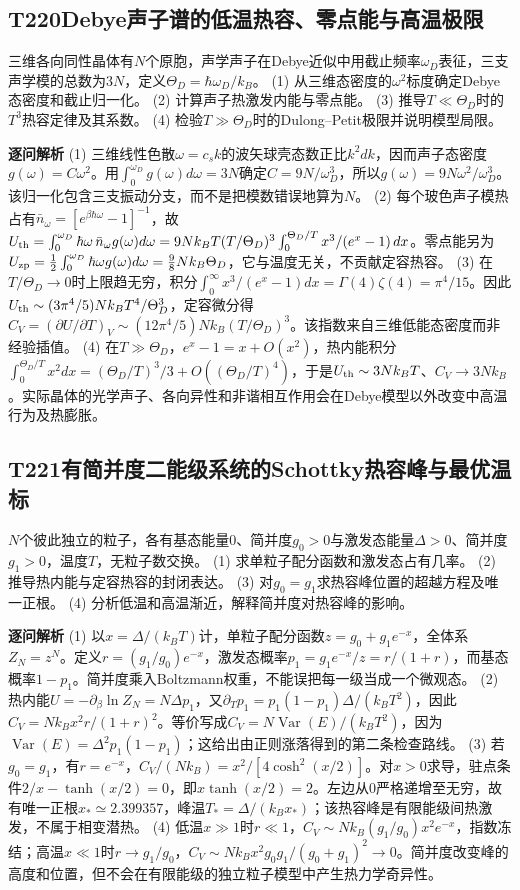 \subsection*{T220\quad Debye声子谱的低温热容、零点能与高温极限}
三维各向同性晶体有$N$个原胞，声学声子在Debye近似中用截止频率$\omega_D$表征，三支声学模的总数为$3N$，定义$\Theta_D=\hbar\omega_D/k_B$。
(1) 从三维态密度的$\omega^2$标度确定Debye态密度和截止归一化。
(2) 计算声子热激发内能与零点能。
(3) 推导$T\ll\Theta_D$时的$T^3$热容定律及其系数。
(4) 检验$T\gg\Theta_D$时的Dulong–Petit极限并说明模型局限。
\par\textbf{逐问解析}
(1) 三维线性色散$\omega=c_sk$的波矢球壳态数正比$k^2dk$，因而声子态密度$g(\omega)=C\omega^2$。用$\int_0^{\omega_D}g(\omega)d\omega=3N$确定$C=9N/\omega_D^3$，所以$g(\omega)=9N\omega^2/\omega_D^3$。该归一化包含三支振动分支，而不是把模数错误地算为$N$。
(2) 每个玻色声子模热占有$\bar n_\omega=[e^{\beta\hbar\omega}-1]^{-1}$，故$U_{\rm th}=\int_0^{\omega_D}\hbar\omega\,\bar n_\omega g(\omega)d\omega=9Nk_BT(T/\Theta_D)^3\int_0^{\Theta_D/T}x^3/(e^x-1)\,dx$。零点能另为$U_{\rm zp}=\frac12\int_0^{\omega_D}\hbar\omega g(\omega)d\omega=\frac98Nk_B\Theta_D$，它与温度无关，不贡献定容热容。
(3) 在$T/\Theta_D\to0$时上限趋无穷，积分$\int_0^\infty x^3/(e^x-1)dx=\Gamma(4)\zeta(4)=\pi^4/15$。因此$U_{\rm th}\sim(3\pi^4/5)Nk_B T^4/\Theta_D^3$，定容微分得$C_V=(\partial U/\partial T)_V\sim(12\pi^4/5)Nk_B(T/\Theta_D)^3$。该指数来自三维低能态密度而非经验插值。
(4) 在$T\gg\Theta_D$，$e^x-1=x+O(x^2)$，热内能积分$\int_0^{\Theta_D/T}x^2dx=(\Theta_D/T)^3/3+O((\Theta_D/T)^4)$，于是$U_{\rm th}\sim3Nk_BT$、$C_V\to3Nk_B$。实际晶体的光学声子、各向异性和非谐相互作用会在Debye模型以外改变中高温行为及热膨胀。
\par\medskip
\subsection*{T221\quad 有简并度二能级系统的Schottky热容峰与最优温标}
$N$个彼此独立的粒子，各有基态能量0、简并度$g_0>0$与激发态能量$\Delta>0$、简并度$g_1>0$，温度$T$，无粒子数交换。
(1) 求单粒子配分函数和激发态占有几率。
(2) 推导热内能与定容热容的封闭表达。
(3) 对$g_0=g_1$求热容峰位置的超越方程及唯一正根。
(4) 分析低温和高温渐近，解释简并度对热容峰的影响。
\par\textbf{逐问解析}
(1) 以$x=\Delta/(k_BT)$计，单粒子配分函数$z=g_0+g_1e^{-x}$，全体系$Z_N=z^N$。定义$r=(g_1/g_0)e^{-x}$，激发态概率$p_1=g_1e^{-x}/z=r/(1+r)$，而基态概率$1-p_1$。简并度乘入Boltzmann权重，不能误把每一级当成一个微观态。
(2) 热内能$U=-\partial_\beta\ln Z_N=N\Delta p_1$，又$\partial_Tp_1=p_1(1-p_1)\Delta/(k_BT^2)$，因此$C_V=Nk_Bx^2r/(1+r)^2$。等价写成$C_V=N\operatorname{Var}(E)/(k_BT^2)$，因为$\operatorname{Var}(E)=\Delta^2p_1(1-p_1)$；这给出由正则涨落得到的第二条检查路线。
(3) 若$g_0=g_1$，有$r=e^{-x}$，$C_V/(Nk_B)=x^2/[4\cosh^2(x/2)]$。对$x>0$求导，驻点条件$2/x-\tanh(x/2)=0$，即$x\tanh(x/2)=2$。左边从0严格递增至无穷，故有唯一正根$x_*\simeq2.399357$，峰温$T_*=\Delta/(k_Bx_*)$；该热容峰是有限能级间热激发，不属于相变潜热。
(4) 低温$x\gg1$时$r\ll1$，$C_V\sim Nk_B(g_1/g_0)x^2e^{-x}$，指数冻结；高温$x\ll1$时$r\to g_1/g_0$，$C_V\sim Nk_Bx^2g_0g_1/(g_0+g_1)^2\to0$。简并度改变峰的高度和位置，但不会在有限能级的独立粒子模型中产生热力学奇异性。
\par\medskip
